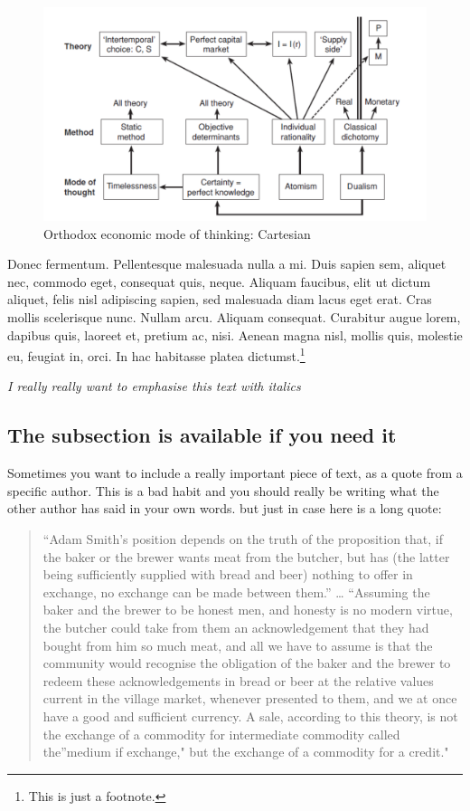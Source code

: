 \documentclass[english,a4paper,12pt]{article}
\begin{document}
\begin{figure}[h!]
    \centering
    \includegraphics[width=0.95\columnwidth]{images/chick2003modeofthought.pdf}
    \caption{Orthodox economic mode of thinking: Cartesian \citep{chick2003}}
    \label{fig:Chick-orthodox}
\end{figure}

Donec fermentum. Pellentesque malesuada nulla a mi. Duis sapien sem, aliquet nec, commodo eget, consequat quis, neque. Aliquam faucibus, elit ut dictum aliquet, felis nisl adipiscing sapien, sed malesuada diam lacus eget erat. Cras mollis scelerisque nunc. Nullam arcu. Aliquam consequat. Curabitur augue lorem, dapibus quis, laoreet et, pretium ac, nisi. Aenean magna nisl, mollis quis, molestie eu, feugiat in, orci. In hac habitasse platea dictumst.\footnote{This is just a footnote.}

\emph{I really really want to emphasise this text with italics}

\subsection{The subsection is available if you need it}

Sometimes you want to include a really important piece of text, as a quote from a specific author. This is a bad habit and you should really be writing what the other author has said in your own words. but just in case here is a long quote:

\begin{quote}
``Adam Smith's position depends on the truth of the proposition that, if
the baker or the brewer wants meat from the butcher, but has (the latter
being sufficiently supplied with bread and beer) nothing to offer in
exchange, no exchange can be made between them.'' \ldots{} ``Assuming
the baker and the brewer to be honest men, and honesty is no modern
virtue, the butcher could take from them an acknowledgement that they
had bought from him so much meat, and all we have to assume is that the
community would recognise the obligation of the baker and the brewer to
redeem these acknowledgements in bread or beer at the relative values
current in the village market, whenever presented to them, and we at
once have a good and sufficient currency. A sale, according to this
theory, is not the exchange of a commodity for intermediate commodity
called the''medium if exchange," but the exchange of a commodity for a
credit."
\end{quote}
\end{document}
